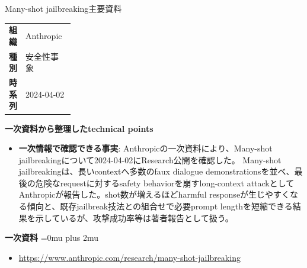 \begin{technicalnote}{Many-shot jailbreaking}{主要資料}
\begingroup
\begin{tabularx}{\linewidth}{@{}>{\bfseries}p{0.22\linewidth}X@{}}
組織 & Anthropic \\
種別 & 安全性事象 \\
時系列 & 2024-04-02 \\
\end{tabularx}
\smallskip
\begin{minipage}{\linewidth}
{\bfseries 一次資料から整理したtechnical points}
\begin{itemize}[leftmargin=1.5em,itemsep=0.35em]
\item \textbf{一次情報で確認できる事実}: Anthropicの一次資料により、Many-shot jailbreakingについて2024-04-02にResearch公開を確認した。 Many-shot jailbreakingは、長いcontextへ多数のfaux dialogue demonstrationsを並べ、最後の危険なrequestに対するsafety behaviorを崩すlong-context attackとしてAnthropicが報告した。shot数が増えるほどharmful responseが生じやすくなる傾向と、既存jailbreak技法との組合せで必要prompt lengthを短縮できる結果を示しているが、攻撃成功率等は著者報告として扱う。
\end{itemize}
\begin{minipage}{\linewidth}
\begin{samepage}
{\bfseries 一次資料}
\begingroup\sloppy
\Urlmuskip=0mu plus 2mu\relax
\begin{itemize}[leftmargin=1.5em,itemsep=0.25em]
\item {\scriptsize\url{https://www.anthropic.com/research/many-shot-jailbreaking}}
\end{itemize}
\endgroup
\end{samepage}
\end{minipage}
\end{minipage}
\endgroup
\end{technicalnote}
\medskip

